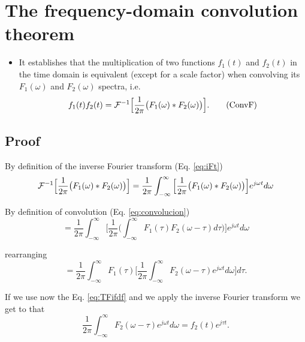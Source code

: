 \section{The frequency-domain convolution theorem}
\begin{itemize}
\item It establishes that the multiplication of two functions $f_1(t)$
  and $f_2(t)$ in the time domain is equivalent (except for a scale
  factor) when convolving its $F_1(\omega)$ and $F_2(\omega)$ spectra,
  i.e.
  \begin{equation}
    f_1(t)f_2(t) = {\cal
      F}^{-1}\Big[\frac{1}{2\pi}\big(F_1(\omega)*F_2(\omega)\big)\Big].
    \tag{ConvF}
    \label{eq:teorema_convolucion_frecuencia}
  \end{equation}
\end{itemize}

\subsection*{Proof}
By definition of the inverse Fourier transform (Eq. \ref{eq:iFt})
\begin{equation*}
  {\cal F}^{-1}\Big[\displaystyle\frac{1}{2\pi}\big(F_1(\omega)*F_2(\omega)\big)\Big] =
  \displaystyle\frac{1}{2\pi}\displaystyle\int_{-\infty}^\infty
  \Big[\frac{1}{2\pi}\big(F_1(\omega)*F_2(\omega)\big)\Big]e^{j\omega t}d\omega
\end{equation*}

By definition of convolution (Eq. \ref{eq:convolucion})
\begin{equation*}
=
  \displaystyle\frac{1}{2\pi}\displaystyle\int_{-\infty}^\infty
  \Big[\frac{1}{2\pi}\big(\displaystyle\int_{-\infty}^\infty
    F_1(\tau)F_2(\omega-\tau)d\tau\big)\Big]e^{j\omega t}d\omega
\end{equation*}

rearranging
\begin{equation*}
=
  \displaystyle\frac{1}{2\pi}\displaystyle\int_{-\infty}^\infty
  F_1(\tau)\Big[\frac{1}{2\pi}\displaystyle\int_{-\infty}^\infty
  F_2(\omega-\tau)e^{j\omega t}d\omega\Big]d\tau.
\end{equation*}

If we use now the Eq. \ref{eq:TFifdf} and we apply the inverse Fourier
transform we get to that
\begin{equation*}
  \frac{1}{2\pi}\int_{-\infty}^\infty F_2(\omega-\tau)e^{j\omega t}d\omega = f_2(t)e^{j\tau t}.
\end{equation*}

